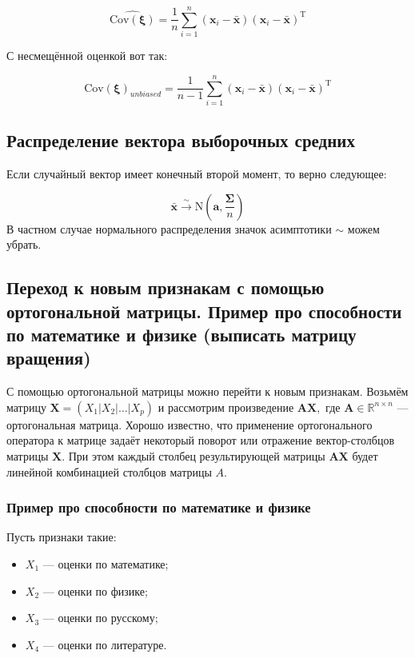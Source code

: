 \documentclass[12pt,a4paper,final]{article}
\begin{document}
$$
\widehat{\mathrm{Cov(\bm \xi)}} = \frac{1}{n} \sum_{i = 1}^{n} (\bm x_i - \bar{\bm x})(\bm x_i - \bar{\bm x})^\mathrm{T}
$$

С несмещённой оценкой вот так:

$$
\widehat{\mathrm{Cov(\bm \xi)}}_\textit{unbiased} = \frac{1}{n-1} \sum_{i = 1}^{n} (\bm x_i - \bar{\bm x})(\bm x_i - \bar{\bm x})^\mathrm{T}
$$


\subsection{Распределение вектора выборочных средних}

Если случайный вектор имеет конечный второй момент, то верно следующее:

$$
\bm{\bar x} \xrightarrow{\sim} \mathrm N\left(\bm a,\frac{ \bm \Sigma}{n}\right)
$$
В частном случае нормального распределения значок асимптотики $\sim$ можем убрать.

\subsection{Переход к новым признакам с помощью ортогональной матрицы. Пример про способности по математике и физике (выписать матрицу вращения)}

С помощью ортогональной матрицы можно перейти к новым признакам. Возьмём матрицу $\bm X = \left( X_1 |  X_2 | \ldots |  X_p \right) $ и рассмотрим произведение 
$
\bm A \bm X,
$
где $\bm A \in \mathbb R^{n \times n}$ --- ортогональная матрица. Хорошо известно, что применение ортогонального оператора к матрице задаёт некоторый поворот или отражение вектор-столбцов матрицы $\bm X$. При этом каждый столбец результирующей матрицы $\bm A \bm X$ будет линейной комбинацией столбцов матрицы $A$.

\subsubsection*{Пример про способности по математике и физике}

Пусть признаки такие:
\begin{itemize}
\item $X_1$ --- оценки по математике;
\item $X_2$ --- оценки по физике;
\item $X_3$ --- оценки по русскому;
\item $X_4$ --- оценки по литературе.
\end{itemize}
\end{document}
